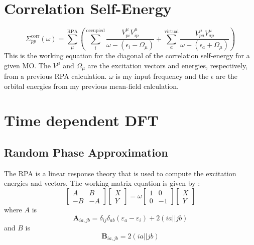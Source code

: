 \documentclass[12pt]{caltech_thesis}
\begin{document}
\section{Correlation Self-Energy}
\begin{equation}
    \Sigma_{pp}^{\text{corr}}(\omega) = \sum_{\mu }^{\text{RPA}}\left(\sum_{i}^{\text{occupied}} \frac{V_{pi}^{\mu }V_{ip}^{\mu }}{\omega -(\epsilon _{i}-\Omega  _{\mu })}+ \sum_{a}^{\text{virtual}} \frac{V_{pa}^{\mu }V_{ap}^{\mu }}{\omega -(\epsilon _{a}+\Omega  _{\mu })}\right)
\end{equation}
This is the working equation for the diagonal of the correlation self-energy for a given MO. The $V^{\mu}$ and $\Omega_{\mu}$ are the excitation vectors and energies, respectively, from a previous RPA calculation. $\omega$ is my input frequency and the $\epsilon$ are the orbital energies from my previous mean-field calculation.



\section{Time dependent DFT}
\subsection{Random Phase Approximation}
The RPA is a linear response theory that is used to compute the excitation energies and vectors. The working matrix equation is given by \autocite{dreuw_single-reference_2005}:
\begin{equation}
\begin{bmatrix}
A & B \\
-B & -A
\end{bmatrix}
\begin{bmatrix}
X \\
Y
\end{bmatrix}
= \omega
\begin{bmatrix}
1 & 0 \\
0 & -1
\end{bmatrix}
\begin{bmatrix}
X \\
Y
\end{bmatrix}
\end{equation}
where $A$ is
\begin{equation}
    \textbf{A}_{ia,jb} = \delta _{ij}\delta _{ab}(\varepsilon _{a}- \varepsilon _{i}) + 2(ia||jb)
\label{eq: A matrix RPA}
\end{equation}
and $B$ is
\begin{equation}
    \textbf{B}_{ia,jb} = 2(ia||jb)
\label{eq: B matrix RPA}
\end{equation}
\end{document}
